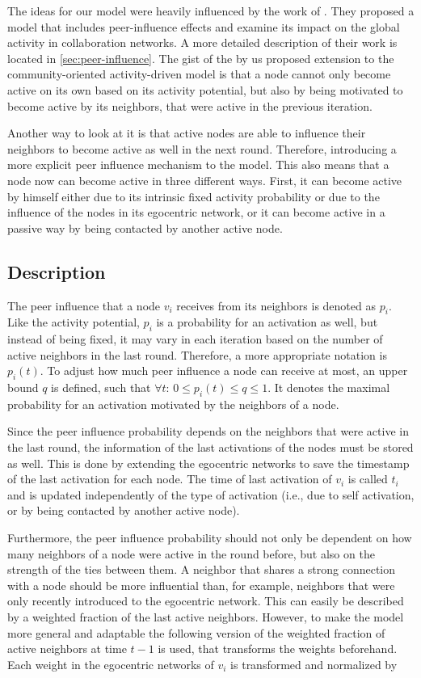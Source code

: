 The ideas for our model were heavily influenced by the work of \citet{Walk2016}.
They proposed a model that includes peer-influence effects and examine its impact on the global activity in collaboration networks.
A more detailed description of their work is located in \cref{sec:peer-influence}.
The gist of the by us proposed extension to the community-oriented activity-driven model is that a node cannot only become active on its own based on its activity potential, but also by being motivated to become active by its neighbors, that were active in the previous iteration.

Another way to look at it is that active nodes are able to influence their neighbors to become active as well in the next round.
Therefore, introducing a more explicit peer influence mechanism to the model.
This also means that a node now can become active in three different ways.
First, it can become active by himself either due to its intrinsic fixed activity probability or due to the influence of the nodes in its egocentric network, or it can become active in a passive way by being contacted by another active node.


\subsection{Description}

The peer influence that a node \( v_{i} \) receives from its neighbors is denoted as \( p_{i} \).
Like the activity potential, \( p_{i} \) is a probability for an activation as well, but instead of being fixed, it may vary in each iteration based on the number of active neighbors in the last round.
Therefore, a more appropriate notation is \( p_{i}(t) \).
To adjust how much peer influence a node can receive at most, an upper bound \( q \) is defined, such that \( \forall t: \, 0 \leq p_{i}(t) \leq q \leq 1 \).
It denotes the maximal probability for an activation motivated by the neighbors of a node.

Since the peer influence probability depends on the neighbors that were active in the last round, the information of the last activations of the nodes must be stored as well.
This is done by extending the egocentric networks to save the timestamp of the last activation for each node.
The time of last activation of \( v_{i} \) is called \( t_{i} \) and is updated independently of the type of activation (i.e., due to self activation, or by being contacted by another active node).

Furthermore, the peer influence probability should not only be dependent on how many neighbors of a node were active in the round before, but also on the strength of the ties between them.
A neighbor that shares a strong connection with a node should be more influential than, for example, neighbors that were only recently introduced to the egocentric network.
This can easily be described by a weighted fraction of the last active neighbors.
However, to make the model more general and adaptable the following version of the weighted fraction of active neighbors at time \( t - 1 \) is used, that transforms the weights beforehand.
Each weight in the egocentric networks of \( v_{i} \) is transformed and normalized by

